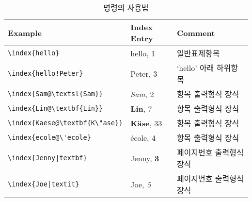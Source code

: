 \begin{table}[!tp]
\caption[index 명령의 사용법]{ 명령의 사용법}
\label{index}
\begin{center}
\begin{tabular}{@{}lll@{}}
  \textbf{Example} &\textbf{Index Entry} &\textbf{Comment}\\\hline
  \rule{0pt}{1.05em}\verb|\index{hello}| &hello, 1 & 일반표제항목 \\
\verb|\index{hello!Peter}|   &\hspace*{2ex}Peter, 3 & `hello' 아래 하위항목\\
\verb|\index{Sam@\textsl{Sam}}|     &\textsl{Sam}, 2& 항목 출력형식 장식\\
\verb|\index{Lin@\textbf{Lin}}|     &\textbf{Lin}, 7& 항목 출력형식 장식\\
\verb|\index{Kaese@\textbf{K\"ase}}|     &\textbf{K\"ase}, 33& 항목 출력형식 장식\\
\verb.\index{ecole@\'ecole}.     &\'ecole, 4& 항목 출력형식 장식\\
\verb.\index{Jenny|textbf}.     &Jenny, \textbf{3}& 페이지번호 출력형식 장식\\
\verb.\index{Joe|textit}.     &Joe, \textit{5}& 페이지번호 출력형식 장식
\end{tabular}
\end{center}
\end{table}


